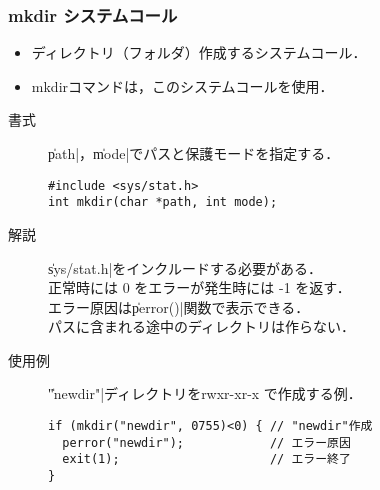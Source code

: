 \documentclass{beamer}                 %
\begin{document}
\begin{frame}[fragile]
  \frametitle{mkdir システムコール}
  \begin{itemize}
  \item ディレクトリ（フォルダ）作成するシステムコール．
  \item mkdirコマンドは，このシステムコールを使用．
  \end{itemize}

  \begin{description}
  \item[書式] \|path|，\|mode|でパスと保護モードを指定する．
\begin{verbatim}
#include <sys/stat.h>
int mkdir(char *path, int mode);
\end{verbatim}

  \item[解説] \|sys/stat.h|をインクルードする必要がある．\\
    正常時には 0 をエラーが発生時には -1 を返す．\\
    エラー原因は\|perror()|関数で表示できる．\\
    パスに含まれる途中のディレクトリは作らない．

  \item[使用例] \|"newdir"|ディレクトリをrwxr-xr-x で作成する例．
\begin{verbatim}
if (mkdir("newdir", 0755)<0) { // "newdir"作成
  perror("newdir");            // エラー原因
  exit(1);                     // エラー終了
}
\end{verbatim}

  \end{description}
\end{frame}
\end{document}
